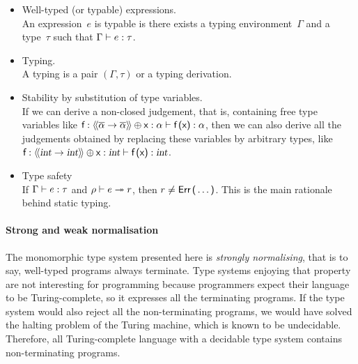 \begin{itemize}

  \item Well\hyp{}typed (or typable) expressions.\\ An
    expression~\(e\) is typable is there exists a typing
    environment~\(\Gamma\) and a type~\(\tau\) such that
    ${\Gamma} \vdash {e} : {\tau}$.

  \item Typing.\\ A typing is a pair $(\Gamma,\tau)$ or a typing
    derivation.

  \item Stability by substitution of type variables.\\ If we can
    derive a non\hyp{}closed judgement, that is, containing free type
    variables like ${\textsf{f}:\langle\!\langle{\overline{\alpha} \rightarrow
        \overline{\alpha}}\rangle\!\rangle \oplus \textsf{x}:\alpha} \vdash {\textsf{f} \,
      \textsf{(}\textsf{x}\textsf{)}} : {\alpha}$, then we can also derive all the
    judgements obtained by replacing these variables by arbitrary
    types, like ${\textsf{f}:\langle\!\langle{\textsl{int} \rightarrow
        \textsl{int}}\rangle\!\rangle \oplus \textsf{x}:\textsl{int}} \vdash {\textsf{f} \,
      \textsf{(}\textsf{x}\textsf{)}} : {\textsl{int}}$.
  
  \item Type safety\\ If ${\Gamma} \vdash {e} : {\tau}$ and
    ${\rho} \vdash {e} \twoheadrightarrow {r}$, then $r \neq \textsf{Err} \,
    \textsf{(}\ldots\textsf{)}$. This is the main rationale behind static
    typing.

\end{itemize}

\paragraph{Strong and weak normalisation}

The monomorphic type system presented here is \emph{strongly
  normalising}, that is to say, well\hyp{}typed programs always
terminate. Type systems enjoying that property are not interesting for
programming because programmers expect their language to be
Turing\hyp{}complete, so it expresses all the terminating programs. If
the type system would also reject all the non\hyp{}terminating
programs, we would have solved the halting problem of the Turing
machine, which is known to be undecidable. Therefore, all
Turing\hyp{}complete language with a decidable type system contains
non\hyp{}terminating programs.

